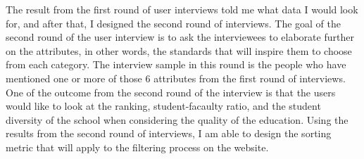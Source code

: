\documentclass[10pt,twocolumn]{article}
\begin{document}
\newline
\indent
The result from the first round of user interviews told me what data I would look for, and after that, I designed the second round of interviews. The goal of the second round of the user interview is to ask the interviewees to elaborate further on the attributes, in other words, the standards that will inspire them to choose from each category. The interview sample in this round is the people who have mentioned one or more of those 6 attributes from the first round of interviews. One of the outcome from the second round of the interview is that the users would like to look at the ranking, student-facaulty ratio, and the student diversity of the school when considering the quality of the education. Using the results from the second round of interviews, I am able to design the sorting metric that will apply to the filtering process on the website. 
\end{document}
